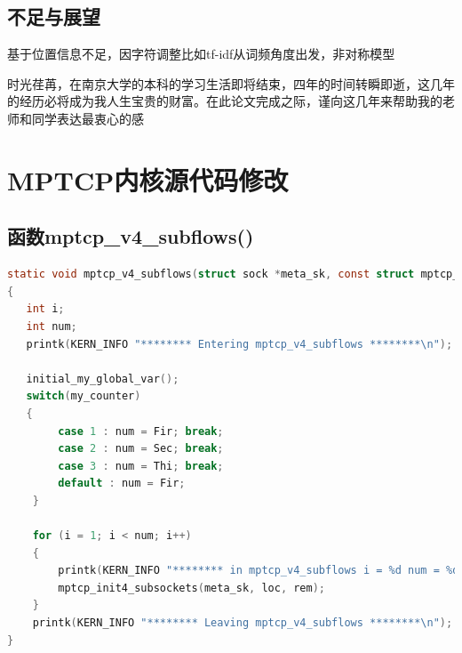 \documentclass[winfonts,master,oneside,nobackinfo]{njuthesis}
\begin{document}
\section{不足与展望}

基于位置信息不足，因字符调整比如tf-idf从词频角度出发，非对称模型




\begin{acknowledgement}
时光荏苒，在南京大学的本科的学习生活即将结束，四年的时间转瞬即逝，这几年的经历必将成为我人生宝贵的财富。在此论文完成之际，谨向这几年来帮助我的老师和同学表达最衷心的感

\end{acknowledgement}








\appendix
\chapter{MPTCP内核源代码修改}\label{app:1}
\section{函数mptcp\_v4\_subflows()}
\begin{lstlisting}[language=C]
static void mptcp_v4_subflows(struct sock *meta_sk, const struct mptcp_loc4 *loc, struct mptcp_rem4 *rem)
{
   int i;
   int num;
   printk(KERN_INFO "******** Entering mptcp_v4_subflows ********\n");

   initial_my_global_var();
   switch(my_counter)
   {
		case 1 : num = Fir; break;
		case 2 : num = Sec; break;
		case 3 : num = Thi; break;
		default : num = Fir;
	}

	for (i = 1; i < num; i++)
	{
		printk(KERN_INFO "******** in mptcp_v4_subflows i = %d num = %d********\n",i,num);
		mptcp_init4_subsockets(meta_sk, loc, rem);
	}
	printk(KERN_INFO "******** Leaving mptcp_v4_subflows ********\n");
}
\end{lstlisting}
\end{document}
